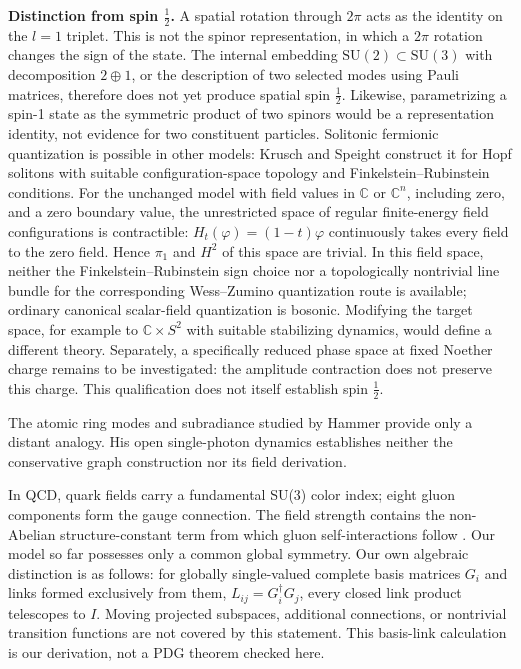\documentclass[a4paper,11pt]{article}
\newcommand{\C}{\mathbb C}
\begin{document}
\textbf{Distinction from spin $\tfrac12$.}
A spatial rotation through $2\pi$ acts as the identity on the $l=1$ triplet. This is not the spinor representation, in which a $2\pi$ rotation changes the sign of the state. The internal embedding $\mathrm{SU}(2)\subset\mathrm{SU}(3)$ with decomposition $2\oplus1$, or the description of two selected modes using Pauli matrices, therefore does not yet produce spatial spin $\tfrac12$. Likewise, parametrizing a spin-1 state as the symmetric product of two spinors would be a representation identity, not evidence for two constituent particles. Solitonic fermionic quantization is possible in other models: Krusch and Speight \cite{Krusch} construct it for Hopf solitons with suitable configuration-space topology and Finkelstein--Rubinstein conditions. For the unchanged model with field values in $\C$ or $\C^n$, including zero, and a zero boundary value, the unrestricted space of regular finite-energy field configurations is contractible: $H_t(\varphi)=(1-t)\varphi$ continuously takes every field to the zero field. Hence $\pi_1$ and $H^2$ of this space are trivial. In this field space, neither the Finkelstein--Rubinstein sign choice nor a topologically nontrivial line bundle for the corresponding Wess--Zumino quantization route is available; ordinary canonical scalar-field quantization is bosonic. Modifying the target space, for example to $\C\times S^2$ with suitable stabilizing dynamics, would define a different theory. Separately, a specifically reduced phase space at fixed Noether charge remains to be investigated: the amplitude contraction does not preserve this charge. This qualification does not itself establish spin $\tfrac12$.

The atomic ring modes and subradiance studied by Hammer \cite{Hammer} provide only a distant analogy. His open single-photon dynamics establishes neither the conservative graph construction nor its field derivation.

In QCD, quark fields carry a fundamental SU(3) color index; eight gluon components form the gauge connection. The field strength contains the non-Abelian structure-constant term from which gluon self-interactions follow \cite[Section~9.1, Eqs.~(9.1)--(9.2)]{PDG}. Our model so far possesses only a common global symmetry. Our own algebraic distinction is as follows: for globally single-valued complete basis matrices $G_i$ and links formed exclusively from them, $L_{ij}=G_i^\dagger G_j$, every closed link product telescopes to $I$. Moving projected subspaces, additional connections, or nontrivial transition functions are not covered by this statement. This basis-link calculation is our derivation, not a PDG theorem checked here.
\end{document}
